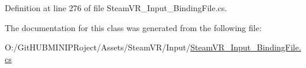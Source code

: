 Definition at line 276 of file Steam\+V\+R\+\_\+\+Input\+\_\+\+Binding\+File.\+cs.



The documentation for this class was generated from the following file\+:\begin{DoxyCompactItemize}
\item 
O\+:/\+Git\+H\+U\+B\+M\+I\+N\+I\+P\+Roject/\+Assets/\+Steam\+V\+R/\+Input/\mbox{\hyperlink{_steam_v_r___input___binding_file_8cs}{Steam\+V\+R\+\_\+\+Input\+\_\+\+Binding\+File.\+cs}}\end{DoxyCompactItemize}
